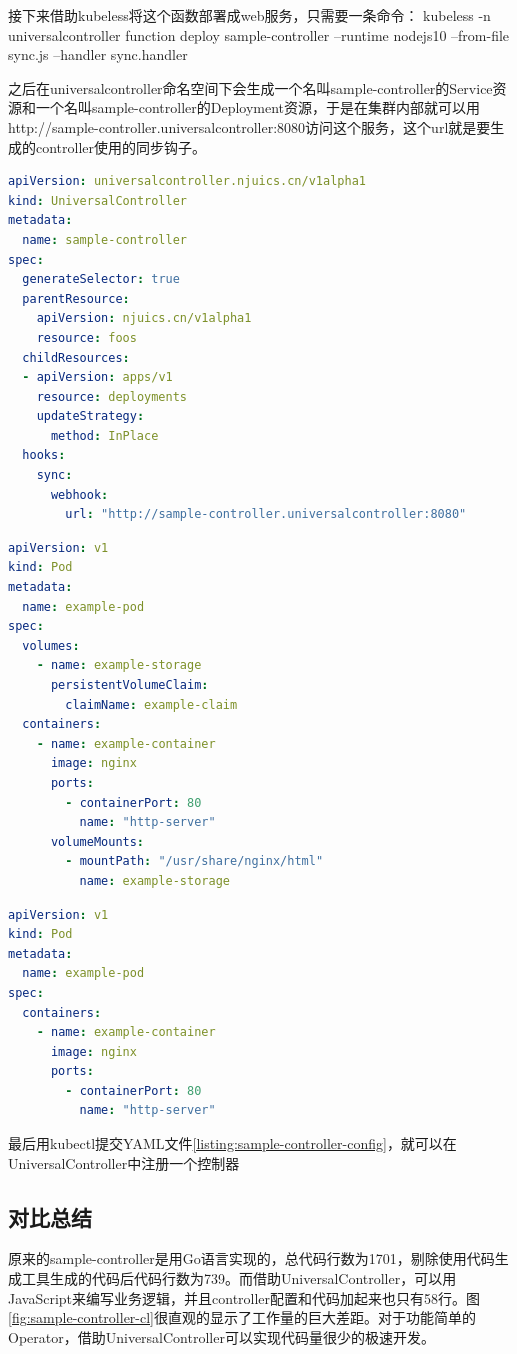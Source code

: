\documentclass[macfonts,master]{njuthesis}
\begin{document}
接下来借助kubeless将这个函数部署成web服务，只需要一条命令：
kubeless -n universalcontroller function deploy sample-controller --runtime nodejs10 --from-file sync.js --handler sync.handler

之后在universalcontroller命名空间下会生成一个名叫sample-controller的Service资源和一个名叫sample-controller的Deployment资源，于是在集群内部就可以用http://sample-controller.universalcontroller:8080访问这个服务，这个url就是要生成的controller使用的同步钩子。

\begin{lstlisting}[language=yaml,caption=sample-controller的配置文件,label=listing:sample-controller-config]
apiVersion: universalcontroller.njuics.cn/v1alpha1
kind: UniversalController
metadata:
  name: sample-controller
spec:
  generateSelector: true
  parentResource:
    apiVersion: njuics.cn/v1alpha1
    resource: foos
  childResources:
  - apiVersion: apps/v1
    resource: deployments
    updateStrategy:
      method: InPlace
  hooks:
    sync:
      webhook:
        url: "http://sample-controller.universalcontroller:8080"
\end{lstlisting}

\newpage
\begin{lstlisting}[language=yaml,caption=sample-controller的配置文件,label=listing:sample-controller-config]
apiVersion: v1
kind: Pod
metadata:
  name: example-pod
spec:
  volumes:
    - name: example-storage
      persistentVolumeClaim:
        claimName: example-claim
  containers:
    - name: example-container
      image: nginx
      ports:
        - containerPort: 80
          name: "http-server"
      volumeMounts:
        - mountPath: "/usr/share/nginx/html"
          name: example-storage
\end{lstlisting}
\newpage
\begin{lstlisting}[language=yaml,caption=sample-controller的配置文件,label=listing:sample-controller-config]
apiVersion: v1
kind: Pod
metadata:
  name: example-pod
spec:
  containers:
    - name: example-container
      image: nginx
      ports:
        - containerPort: 80
          name: "http-server"
\end{lstlisting}

最后用kubectl提交YAML文件\ref{listing:sample-controller-config}，就可以在UniversalController中注册一个控制器

\subsection{对比总结}
原来的sample-controller是用Go语言实现的，总代码行数为1701，剔除使用代码生成工具生成的代码后代码行数为739。而借助UniversalController，可以用JavaScript来编写业务逻辑，并且controller配置和代码加起来也只有58行。图\ref{fig:sample-controller-cl}很直观的显示了工作量的巨大差距。对于功能简单的Operator，借助UniversalController可以实现代码量很少的极速开发。
\end{document}
